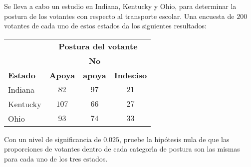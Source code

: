 \begin{enunciado}
 Se lleva a cabo un estudio en Indiana, Kentucky y Ohio,
 para determinar la postura de los votantes con respecto al transporte
 escolar.
 Una encuesta de $200$ votantes de cada uno de estos estados
 da los siguientes resultados:
 \begin{center}
  \begin{tabular}{lccc}
   & \multicolumn{3}{c}{\textbf{Postura del votante}} \\
   \cline{2-4}
   & & \textbf{No} & \\
   \textbf{Estado} & \textbf{Apoya} & \textbf{apoya} & \textbf{Indeciso} \\
   \hline 
   Indiana & $82$ & $97$ & $21$ \\
   Kentucky & $107$ & $66$ & $27$ \\
   Ohio & $93$ & $74$ & $33$
  \end{tabular}
 \end{center}
 Con un nivel de significancia de $0.025$, pruebe la hip\'otesis nula
 de que las proporciones de votantes dentro de cada categor\'{\i}a
 de postura son las mismas para cada uno de los tres estados.
\end{enunciado}

